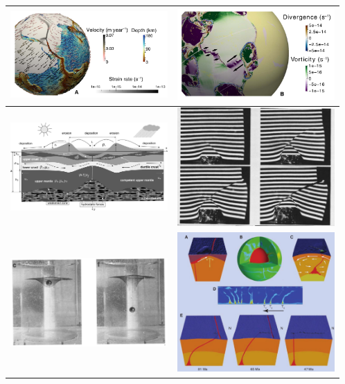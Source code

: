 \begin{tabular}{p{8cm}p{8cm}}
\includegraphics[width=6cm]{images/beautiful/cohf19a} &
\includegraphics[width=6cm]{images/beautiful/cohf19b} \cite{cohf19}  \\ \hline
\includegraphics[width=6cm]{images/beautiful/bucl97} \cite{bucl97} &
\includegraphics[width=6cm]{images/beautiful/peta88} \cite{peta88} \\ \hline
\includegraphics[width=6cm]{images/beautiful/crud88} \cite{crud88} &
\includegraphics[width=6cm]{images/beautiful/tabs09}\cite{tabs09} \\ \hline

\end{tabular}
